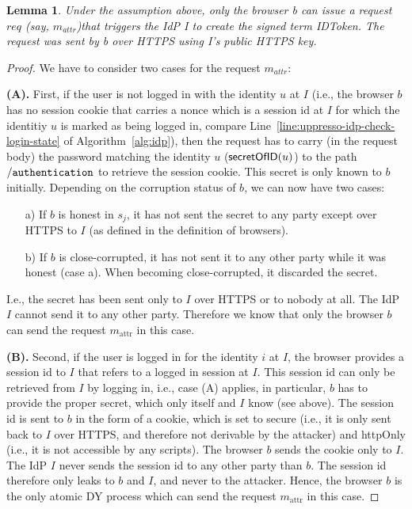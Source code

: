 \documentclass[letterpaper,onecolumn,10pt]{article}
\newtheorem{lemma}{Lemma}
\begin{document}
\begin{lemma} %
  Under the assumption above, only the browser b can issue a request $req$
  (say, $m_{attr}$)that triggers the IdP I to create the signed term IDToken. The 
  request was sent by b over HTTPS using I's public HTTPS key.
\end{lemma}
\begin{proof}
  We have to consider two cases for the request $m_{attr}$:

  \textbf{(A).} First, if the user is not logged in with the identity $u$ at $I$
  (i.e., the browser $b$ has no session cookie that carries a nonce
  which is a session id at $I$ for which the identitiy $u$ is marked
  as being logged in, compare Line~\ref{line:uppresso-idp-check-login-state} of
  Algorithm~\ref{alg:idp}), then the request has to carry (in
  the request body) the password matching the identity $u$ ($\mathsf{secretOfID}(u)$) to the 
  path $\mathtt{/authentication}$ to retrieve the session cookie. This secret is only 
  known to $b$ initially. Depending on the corruption status of $b$, we can now have two
  cases:
  \begin{enumerate}
  \item[a)] If $b$ is honest in $s_j$, it has not sent the secret to
    any party except over HTTPS to $I$ (as defined in the definition
    of browsers). 
  \item[b)] If $b$ is close-corrupted, it has not sent it to any other
    party while it was honest (case a). When becoming close-corrupted,
    it discarded the secret.
  \end{enumerate}

  I.e., the secret has been sent only to $I$ over HTTPS or to nobody
  at all. The IdP $I$ cannot send it to any other party. Therefore we
  know that only the browser $b$ can send the request $m_\text{attr}$
  in this case.

  \textbf{(B).} Second, if the user is logged in for the identity $i$
  at $I$, the browser provides a session id to $I$ that refers to a
  logged in session at $I$. This session id can only be retrieved from
  $I$ by logging in, i.e., case (A) applies, in particular, $b$ has to
  provide the proper secret, which only itself and $I$ know (see
  above). The session id is sent to $b$ in the form of a cookie, which
  is set to secure (i.e., it is only sent back to $I$ over HTTPS, and
  therefore not derivable by the attacker) and httpOnly (i.e., it is 
  not accessible by any scripts). The browser $b$ sends the cookie only 
  to $I$. The IdP $I$ never sends the session id to any other party than 
  $b$. The session id therefore only leaks to $b$ and $I$, and never to 
  the attacker. Hence, the browser $b$ is the only atomic DY process which 
  can send the request $m_\text{attr}$ in this case.


\end{proof}
\end{document}
